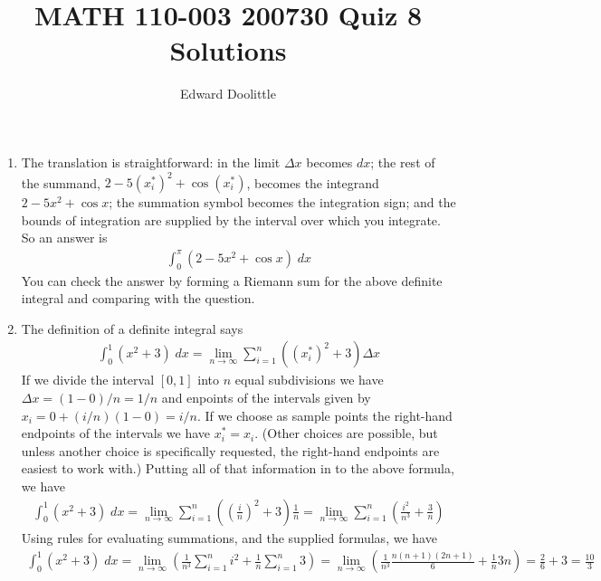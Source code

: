 \documentclass[12pt]{article}
\title{MATH 110-003 200730 Quiz 8 Solutions}
\author{Edward Doolittle}
\begin{document}
\maketitle

\begin{enumerate}
\item The translation is straightforward: in the limit $\Delta x$ becomes $dx$;
  the rest of the summand, $2-5(x_i^*)^2+\cos(x_i^*)$,
  becomes the integrand $2-5x^2+\cos x$; the summation symbol becomes the
  integration sign; and the bounds of integration are supplied by the interval
  over which you integrate.  So an answer is
  \begin{align*}
    \int_0^\pi (2-5x^2+\cos x) \; dx
  \end{align*}
  You can check the answer by forming a Riemann sum for the above definite
  integral and comparing with the question.
\item The definition of a definite integral says
  \begin{align*}
    \int_0^1 (x^2+3) \; dx
    = \lim_{n\to\infty} \sum_{i=1}^n \left( (x_i^*)^2 + 3 \right) \Delta x
  \end{align*}
  If we divide the interval $[0,1]$ into $n$ equal subdivisions we have
  $\Delta x=(1-0)/n=1/n$ and enpoints of the intervals given by
  $x_i=0+(i/n)(1-0) = i/n$.  If we choose as sample points the right-hand
  endpoints of the intervals we have $x_i^* = x_i$.  (Other choices are
  possible, but unless another choice is specifically requested, the 
  right-hand endpoints are easiest to work with.)  Putting all of that 
  information in to the above formula, we have
  \begin{align*}
    \int_0^1 (x^2+3) \; dx
    = \lim_{n\to\infty}\sum_{i=1}^n\left(\left(\frac{i}{n}\right)^2+3\right)
    \frac{1}{n}
    = \lim_{n\to\infty}\sum_{i=1}^n \left(\frac{i^2}{n^3} + \frac{3}{n}\right)
  \end{align*}
  Using rules for evaluating summations, and the supplied formulas, we have
  \begin{align*}
    \int_0^1 (x^2+3) \; dx
    = \lim_{n\to\infty} \left( \frac{1}{n^3} \sum_{i=1}^n i^2
    + \frac{1}{n} \sum_{i=1}^n 3 \right)
    = \lim_{n\to\infty} \left( \frac{1}{n^3} \frac{n(n+1)(2n+1)}{6}
    + \frac{1}{n} 3n \right)
    = \frac{2}{6} + 3 = \frac{10}{3}
  \end{align*}
\end{enumerate}
\end{document}

